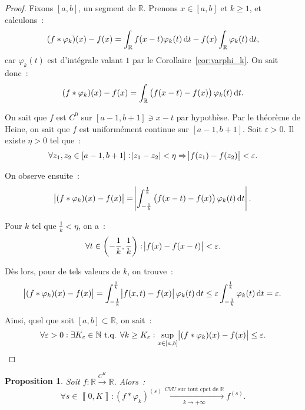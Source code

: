 \documentclass{report}
\newtheorem{prp}[thm]{Proposition}
\theoremstyle{definition}
\theoremstyle{remark}
\numberwithin{equation}{section}
\newcommand{\R}{\mathbb R}
\newcommand{\N}{\mathbb N}
\newcommand{\tq}{\text{ t.q. }}
\newcommand{\CONV}[5]{\xrightarrow[#2 \to #3]{#4 \text{ #5 } #1}}
\newcommand{\CVUc}[3]{\CONV{#1}{#2}{#3}{CVU}{sur tout cpct de}}
\newcommand{\intint}[2]{\left\llbracket#1, #2\right\rrbracket}
\newcommand{\toC}[1]{\xrightarrow{C^{#1}}}
\newcommand{\pinfty}{{+\infty}}
\begin{document}
			\begin{proof} Fixons $[a, b]$, un segment de $\R$. Prenons $x \in [a, b]$ et $k \geq 1$, et calculons~:
			\begin{equation}
				(f*\varphi_k)(x)-f(x) = \int_\R f(x-t)\varphi_k(t)\dif t - f(x)\int_\R\varphi_k(t)\dif t,
			\end{equation}
			car $\varphi_k(t)$ est d'intégrale valant $1$ par le Corollaire~\ref{cor:varphi_k}. On sait donc~:
			\begin{equation}
				(f*\varphi_k)(x) - f(x) = \int_\R \left(f(x-t)-f(x)\right)\varphi_k(t)\dif t.
			\end{equation}

			On sait que $f$ est $C^0$ sur $[a-1, b+1] \ni x-t$ par hypothèse. Par le théorème de Heine, on sait que $f$ est uniformément continue sur $[a-1, b+1]$.
			Soit $\varepsilon > 0$. Il existe $\eta > 0$ tel que~:
			\begin{equation}
				\forall z_1, z_2 \in [a-1, b+1] : \abs {z_1-z_2} < \eta \Rightarrow \abs {f(z_1)-f(z_2)} < \varepsilon.
			\end{equation}

			On observe ensuite~:
			\begin{equation}
				\abs {(f*\varphi_k)(x)-f(x)} = \abs {\int_{-\frac 1k}^{\frac 1k}\left(f(x-t)-f(x)\right)\varphi_k(t)\dif t}.
			\end{equation}

			Pour $k$ tel que $\frac 1k < \eta$, on a~:
			\begin{equation}
				\forall t \in \left(-\frac 1k, \frac 1k\right) : \abs {f(x)-f(x-t)} < \varepsilon.
			\end{equation}

			Dès lors, pour de tels valeurs de $k$, on trouve~:
			\begin{equation}
				\abs {(f*\varphi_k)(x)-f(x)} = \int_{-\frac 1k}^{\frac 1k}\abs {f(x, t)-f(x)}\varphi_k(t)\dif t
				\leq \varepsilon\int_{-\frac 1k}^{\frac 1k}\varphi_k(t)\dif t = \varepsilon.
			\end{equation}

			Ainsi, quel que soit $[a, b] \subset \R$, on sait~:
			\begin{equation}
				\forall \varepsilon > 0 : \exists K_\varepsilon \in \N \tq \forall k \geq K_\varepsilon : \sup_{x \in [a, b]}\abs {(f*\varphi_k)(x)-f(x)} \leq \varepsilon.
			\end{equation}
			\end{proof}

			\begin{prp} Soit $f : \R \toC K \R$. Alors~:
			\begin{equation}
				\forall s \in \intint 0K : \left(f*\varphi_k\right)^{(s)} \CVUc \R k\pinfty f^{(s)}.
			\end{equation}
			\end{prp}
\end{document}
